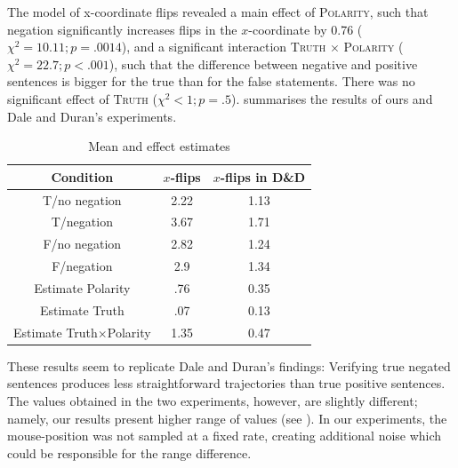 \documentclass{article}
\begin{document}

The model of x-coordinate flips revealed a main effect of \textsc{Polarity}, such that negation significantly increases flips in the $x$-coordinate by 0.76 ($\chi^{2}=10.11; p=.0014$), and a significant interaction \textsc{Truth} $\times$ \textsc{Polarity} ($\chi^{2}=22.7; p<.001$), such that the difference between negative and positive sentences is bigger for the true than for the false statements. There was no significant effect of \textsc{Truth} ($\chi^{2}<1; p=.5$). 
 summarises the results of ours and Dale and Duran's experiments. 

\begin{table}[h]
\begin{center}
\begin{tabular}{ccc}
Condition & $x$-flips &  $x$-flips in D\&D \\
\hline
T/no negation & 2.22 & 1.13 \\
T/negation & 3.67 & 1.71 \\
F/no negation & 2.82 & 1.24 \\
F/negation & 2.9 & 1.34 \\
Estimate Polarity & .76 & 0.35 \\
Estimate Truth & .07 & 0.13 \\
Estimate Truth$\times$Polarity & 1.35 & 0.47\\
\end{tabular}
\caption{Mean and effect estimates}
\label{table:negationresults}
\end{center}
\end{table}%

These results seem to replicate Dale and Duran's findings: Verifying true negated sentences produces less straightforward trajectories than true positive sentences. The values obtained in the two experiments, however, are slightly different; namely, our results present higher range of values (see ). 
In our experiments, the mouse-position was not sampled at a fixed rate, creating additional noise which could be responsible for the range difference. 
\end{document}
